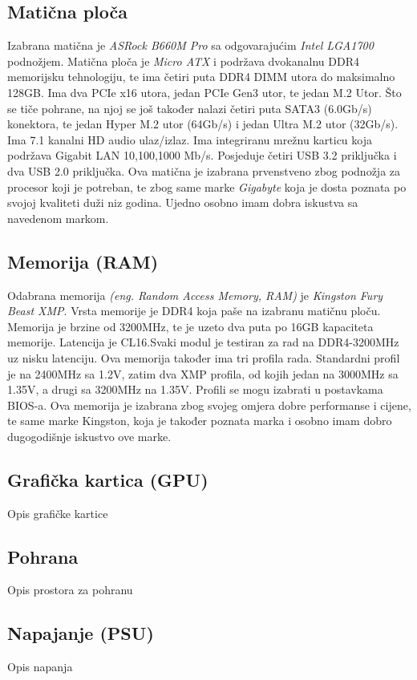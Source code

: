 \documentclass{article}
\begin{document}
    \subsection{Matična ploča}
    Izabrana matična je \textit{ASRock B660M Pro} sa odgovarajućim \textit{Intel LGA1700} podnožjem. Matična ploča je \textit{Micro ATX} i podržava dvokanalnu DDR4 memorijsku tehnologiju, te ima četiri puta DDR4 DIMM utora do maksimalno 128GB. Ima dva PCIe x16 utora, jedan PCIe Gen3 utor, te jedan M.2 Utor. Što se tiče pohrane, na njoj se još također nalazi četiri puta SATA3 (6.0Gb/s) konektora, te jedan Hyper M.2 utor (64Gb/s) i jedan Ultra M.2 utor (32Gb/s). Ima 7.1 kanalni HD audio ulaz/izlaz. Ima integriranu mrežnu karticu koja podržava Gigabit LAN 10,100,1000 Mb/s. Posjeduje četiri USB 3.2 priključka i dva USB 2.0 priključka. Ova matična je izabrana prvenstveno zbog podnožja za procesor koji je potreban, te zbog same marke \textit{Gigabyte} koja je dosta poznata po svojoj kvaliteti duži niz godina. Ujedno osobno imam dobra iskustva sa navedenom markom.

    \clearpage
    \subsection{Memorija (RAM)}
    Odabrana memorija \emph{(eng. Random Access Memory, RAM)} je \textit{Kingston Fury Beast XMP}. Vrsta memorije je DDR4 koja paše na izabranu matičnu ploču. Memorija je brzine od 3200MHz, te je uzeto dva puta po 16GB kapaciteta memorije. Latencija je CL16.Svaki modul je testiran za rad na DDR4-3200MHz uz nisku latenciju. Ova memorija također ima tri profila rada. Standardni profil je na 2400MHz sa 1.2V, zatim dva XMP profila, od kojih jedan na 3000MHz sa 1.35V, a drugi sa 3200MHz na 1.35V. Profili se mogu izabrati u postavkama BIOS-a. Ova memorija je izabrana zbog svojeg omjera dobre performanse i cijene, te same marke Kingston, koja je također poznata marka i osobno imam dobro dugogodišnje iskustvo ove marke.

    \subsection{Grafička kartica (GPU)}
    Opis grafičke kartice

    \subsection{Pohrana}
    Opis prostora za pohranu

    \subsection{Napajanje (PSU)}
    Opis napanja
\end{document}
